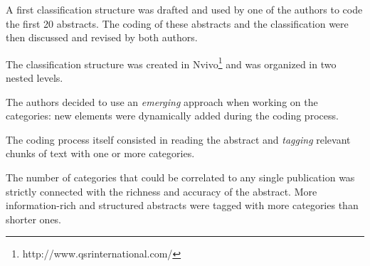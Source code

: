 A first classification structure was drafted and used by one of the authors to code the first 20 abstracts. The coding of these abstracts and the classification were then discussed and revised by both authors.

The classification structure was created in Nvivo\footnote{http://www.qsrinternational.com/} and was organized in two nested levels.

The authors decided to use an \textit{emerging} approach when working on the categories: new elements were dynamically added during the coding process.

The coding process itself consisted in reading the abstract and \textit{tagging} relevant chunks of text with one or more categories.

The number of categories that could be correlated to any single publication was strictly connected with the richness and accuracy of the abstract. More information-rich and structured abstracts were tagged with more categories than shorter ones.